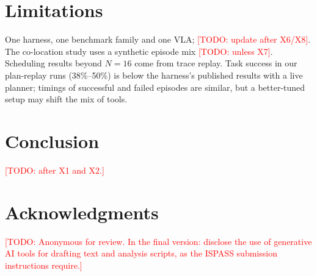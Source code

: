 \documentclass[conference,10pt]{IEEEtran}
\newcommand{\pct}[1]{#1\%}
\newcommand{\todo}[1]{\textcolor{red}{[TODO: #1]}}
\begin{document}
\section{Limitations}

One harness, one benchmark family and one VLA; \todo{update after X6/X8}. The co-location
study uses a synthetic episode mix \todo{unless X7}. Scheduling results beyond $N{=}16$ come
from trace replay. Task success in our plan-replay runs (\pct{38}--\pct{50}) is below the
harness's published results with a live planner; timings of successful and failed episodes
are similar, but a better-tuned setup may shift the mix of tools.

\section{Conclusion}

\todo{after X1 and X2.}

\section*{Acknowledgments}
\todo{Anonymous for review. In the final version: disclose the use of generative AI tools
for drafting text and analysis scripts, as the ISPASS submission instructions require.}



\end{document}
